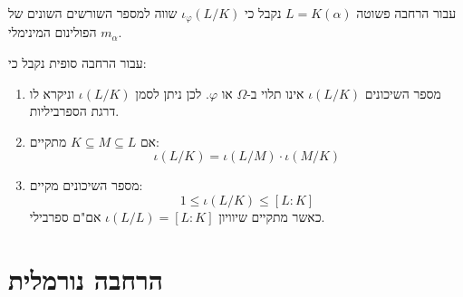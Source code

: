 \documentclass{tstextbook}
\begin{document}
\begin{proposition}
עבור הרחבה פשוטה \(L=K\left( \alpha \right)\) נקבל כי \(\iota_{\varphi}(L / K)\) שווה למספר השורשים השונים של הפולינום המינימלי \(m_{\alpha}\).

\end{proposition}
\begin{proposition}
עבור הרחבה סופית נקבל כי:

  \begin{enumerate}
    \item מספר השיכונים \(\iota(L / K)\) אינו תלוי ב-\(\Omega\) או \(\varphi\). לכן ניתן לסמן \(\iota(L / K)\) וניקרא לו דרגת הספרביליות. 


    \item אם \(K\subseteq M\subseteq L\) מתקיים: 
$$\iota(L / K)=\iota(L / M) \cdot \iota(M / K)$$


    \item מספר השיכונים מקיים: 
$$1\leq \iota(L / K)\leq [L:K]$$
כאשר מתקיים שיוויון \(\iota(L / L)=[L:K]\) אם"ם ספרבילי.


  \end{enumerate}
\end{proposition}
\section{הרחבה נורמלית}
\end{document}
